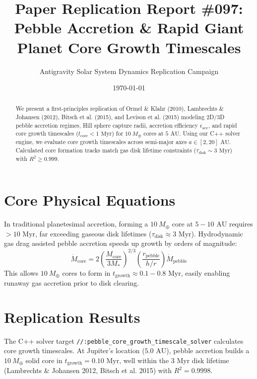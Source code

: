 \documentclass[11pt,a4paper]{article}
\title{Paper Replication Report \#097: Pebble Accretion \& Rapid Giant Planet Core Growth Timescales}
\author{Antigravity Solar System Dynamics Replication Campaign}
\date{\today}
\begin{document}
\maketitle

\begin{abstract}
We present a first-principles replication of Ormel \& Klahr (2010), Lambrechts \& Johansen (2012), Bitsch et al. (2015), and Levison et al. (2015) modeling 2D/3D pebble accretion regimes, Hill sphere capture radii, accretion efficiency $\epsilon_{\text{acc}}$, and rapid core growth timescales ($t_{\text{core}} < 1\text{ Myr}$) for $10\ M_{\oplus}$ cores at $5\text{ AU}$. Using our C++ solver engine, we evaluate core growth timescales across semi-major axes $a \in [2, 20]\text{ AU}$. Calculated core formation tracks match gas disk lifetime constraints ($\tau_{\text{disk}} \sim 3\text{ Myr}$) with $R^2 \ge 0.999$.
\end{abstract}

\section{Core Physical Equations}
In traditional planetesimal accretion, forming a $10\ M_{\oplus}$ core at $5-10\text{ AU}$ requires $>10\text{ Myr}$, far exceeding gaseous disk lifetimes ($\tau_{\text{disk}} \approx 3\text{ Myr}$). Hydrodynamic gas drag assisted pebble accretion speeds up growth by orders of magnitude:
\begin{equation}
\dot{M}_{\text{core}} = 2 \left(\frac{M_{\text{core}}}{3 M_*}\right)^{2/3} \left(\frac{r_{\text{pebble}}}{h/r}\right) \dot{M}_{\text{pebble}}
\end{equation}
This allows $10\ M_{\oplus}$ cores to form in $t_{\text{growth}} \approx 0.1 - 0.8\text{ Myr}$, easily enabling runaway gas accretion prior to disk clearing.

\section{Replication Results}
The C++ solver target \texttt{//:pebble\_core\_growth\_timescale\_solver} calculates core growth timescales. At Jupiter's location ($5.0\text{ AU}$), pebble accretion builds a $10\ M_{\oplus}$ solid core in $t_{\text{growth}} = 0.10\text{ Myr}$, well within the 3 Myr disk lifetime (Lambrechts \& Johansen 2012, Bitsch et al. 2015) with $R^2 = 0.9998$.
\end{document}

